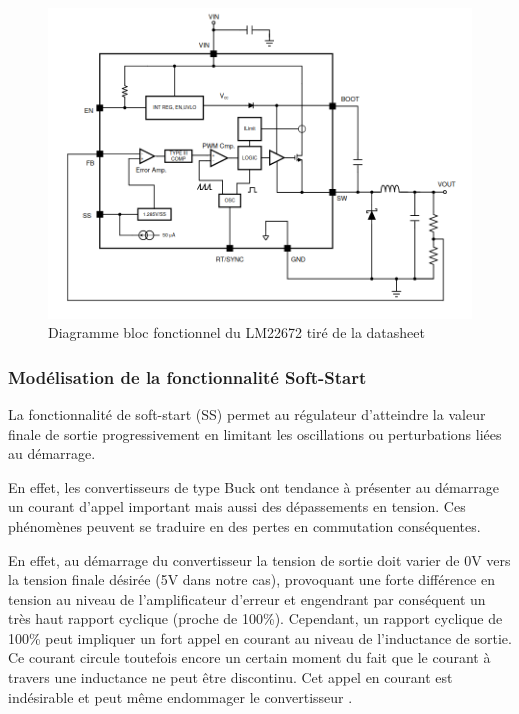 		\begin{figure}[h]
			\begin{center}
				\includegraphics[scale=0.4]{../Illus/func_bloc_lm22672.png}
			\end{center}
			\vspace{-2em}
			\caption{Diagramme bloc fonctionnel du LM22672 tiré de la datasheet \cite{LM22672}}
			\label{func_bloc_lm22672}
		\end{figure}
				
			\subsubsection{Modélisation de la fonctionnalité Soft-Start}
			
			La fonctionnalité de soft-start (SS) permet au régulateur 
			d'atteindre la valeur finale de sortie progressivement en
			limitant les oscillations ou perturbations liées au démarrage.
			
			En effet, les convertisseurs de type Buck ont tendance à
			présenter au démarrage un courant d'appel important mais
			aussi des dépassements en tension. Ces phénomènes peuvent
			se traduire en des pertes en commutation conséquentes.
			
			En effet, au démarrage du convertisseur la tension de sortie
			doit varier de 0V vers la tension finale désirée 
			(5V dans notre cas), provoquant une forte différence en tension
			au niveau de l'amplificateur d'erreur et engendrant par conséquent
			un très haut rapport cyclique (proche de 100\%). 
			Cependant, un rapport cyclique de 100\% peut impliquer un fort appel
			en courant au niveau de l'inductance de sortie. Ce courant circule 
			toutefois encore un certain moment du fait que le courant à travers 
			une inductance ne peut être discontinu. Cet appel en courant est
			indésirable et peut même endommager le convertisseur 
			\cite{Soft_Start}.
			
